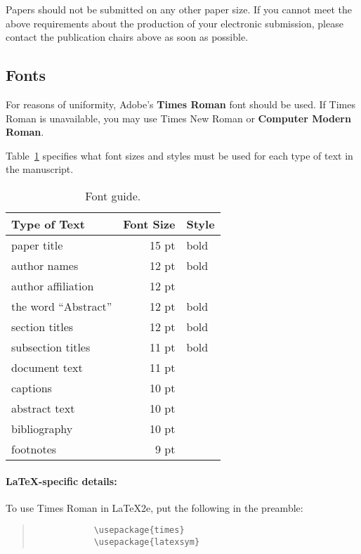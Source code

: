 \documentclass[11pt,a4paper]{article}
\begin{document}
	\noindent Papers should not be submitted on any other paper size.
	If you cannot meet the above requirements about the production of your electronic submission, please contact the publication chairs above as soon as possible.
	
	\subsection{Fonts}
	
	For reasons of uniformity, Adobe's \textbf{Times Roman} font should be used.
	If Times Roman is unavailable, you may use Times New Roman or \textbf{Computer Modern Roman}.
	
	Table~\ref{font-table} specifies what font sizes and styles must be used for each type of text in the manuscript.
	
	\begin{table}
		\centering
		\begin{tabular}{lrl}
			\hline \textbf{Type of Text} & \textbf{Font Size} & \textbf{Style} \\ \hline
			paper title & 15 pt & bold \\
			author names & 12 pt & bold \\
			author affiliation & 12 pt & \\
			the word ``Abstract'' & 12 pt & bold \\
			section titles & 12 pt & bold \\
			subsection titles & 11 pt & bold \\
			document text & 11 pt  &\\
			captions & 10 pt & \\
			abstract text & 10 pt & \\
			bibliography & 10 pt & \\
			footnotes & 9 pt & \\
			\hline
		\end{tabular}
		\caption{\label{font-table} Font guide. }
	\end{table}
	
	\paragraph{\LaTeX-specific details:}
	To use Times Roman in \LaTeX2e{}, put the following in the preamble:
	\begin{quote}
		\small
		\begin{verbatim}
			\usepackage{times}
			\usepackage{latexsym}
		\end{verbatim}
	\end{quote}
	
\end{document}
